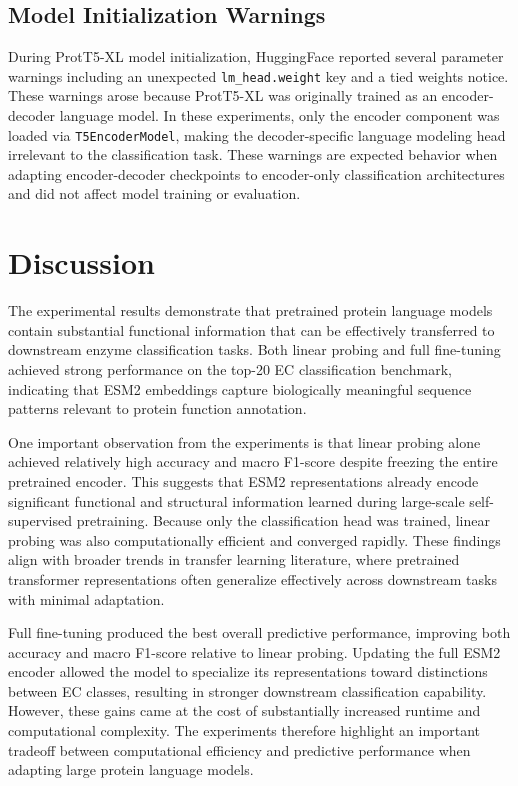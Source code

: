 \documentclass{article}
\begin{document}
\subsection{Model Initialization Warnings}

During ProtT5-XL model initialization, HuggingFace reported several parameter warnings including an unexpected \texttt{lm\_head.weight} key and a tied weights notice. These warnings arose because ProtT5-XL was originally trained as an encoder-decoder language model. In these experiments, only the encoder component was loaded via \texttt{T5EncoderModel}, making the decoder-specific language modeling head irrelevant to the classification task. These warnings are expected behavior when adapting encoder-decoder checkpoints to encoder-only classification architectures and did not affect model training or evaluation.
\section{Discussion}

The experimental results demonstrate that pretrained protein language models contain substantial functional information that can be effectively transferred to downstream enzyme classification tasks. Both linear probing and full fine-tuning achieved strong performance on the top-20 EC classification benchmark, indicating that ESM2 embeddings capture biologically meaningful sequence patterns relevant to protein function annotation.

One important observation from the experiments is that linear probing alone achieved relatively high accuracy and macro F1-score despite freezing the entire pretrained encoder. This suggests that ESM2 representations already encode significant functional and structural information learned during large-scale self-supervised pretraining. Because only the classification head was trained, linear probing was also computationally efficient and converged rapidly. These findings align with broader trends in transfer learning literature, where pretrained transformer representations often generalize effectively across downstream tasks with minimal adaptation.

Full fine-tuning produced the best overall predictive performance, improving both accuracy and macro F1-score relative to linear probing. Updating the full ESM2 encoder allowed the model to specialize its representations toward distinctions between EC classes, resulting in stronger downstream classification capability. However, these gains came at the cost of substantially increased runtime and computational complexity. The experiments therefore highlight an important tradeoff between computational efficiency and predictive performance when adapting large protein language models.
\end{document}
